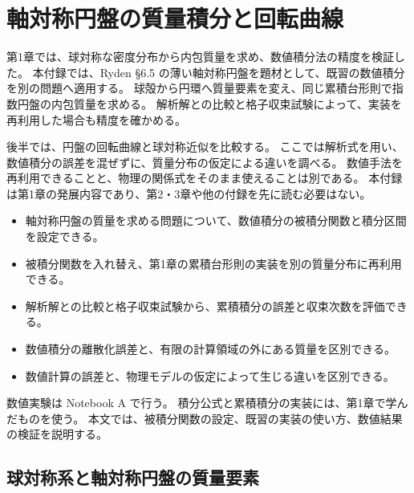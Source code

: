 \chapter{軸対称円盤の質量積分と回転曲線}
\label{app:disk-integrals}

第1章では、球対称な密度分布から内包質量を求め、数値積分法の精度を検証した。
本付録では、Ryden §6.5 の薄い軸対称円盤を題材として、既習の数値積分を別の問題へ適用する\cite{ryden2025}。
球殻から円環へ質量要素を変え、同じ累積台形則で指数円盤の内包質量を求める。
解析解との比較と格子収束試験によって、実装を再利用した場合も精度を確かめる。

後半では、円盤の回転曲線と球対称近似を比較する。
ここでは解析式を用い、数値積分の誤差を混ぜずに、質量分布の仮定による違いを調べる。
数値手法を再利用できることと、物理の関係式をそのまま使えることは別である。
本付録は第1章の発展内容であり、第2・3章や他の付録を先に読む必要はない。

\begin{learningbox}[本付録で学ぶこと]
\begin{itemize}
\item 軸対称円盤の質量を求める問題について、数値積分の被積分関数と積分区間を設定できる。
\item 被積分関数を入れ替え、第1章の累積台形則の実装を別の質量分布に再利用できる。
\item 解析解との比較と格子収束試験から、累積積分の誤差と収束次数を評価できる。
\item 数値積分の離散化誤差と、有限の計算領域の外にある質量を区別できる。
\item 数値計算の誤差と、物理モデルの仮定によって生じる違いを区別できる。
\end{itemize}
\end{learningbox}

数値実験は Notebook A で行う。
積分公式と累積積分の実装には、第1章で学んだものを使う\cite{kouya2021}。
本文では、被積分関数の設定、既習の実装の使い方、数値結果の検証を説明する。

\section{球対称系と軸対称円盤の質量要素}
\label{sec:appA-annulus}

